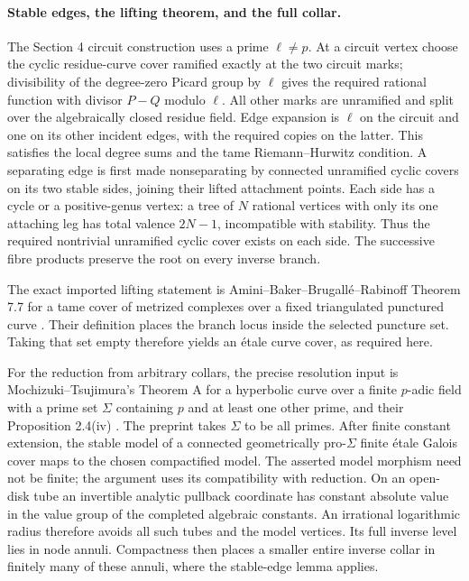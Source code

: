 \paragraph{Stable edges, the lifting theorem, and the full collar.}
The Section 4 circuit construction uses a prime $\ell\ne p$.
At a circuit vertex choose the cyclic residue-curve cover
ramified exactly at the two circuit marks; divisibility of
the degree-zero Picard group by $\ell$ gives the required
rational function with divisor $P-Q$ modulo $\ell$. All
other marks are unramified and split over the algebraically
closed residue field. Edge expansion is $\ell$ on the
circuit and one on its other incident edges, with the
required copies on the latter. This satisfies the local
degree sums and the tame Riemann--Hurwitz condition. A
separating edge is first made nonseparating by connected
unramified cyclic covers on its two stable sides, joining
their lifted attachment points. Each side has a cycle or
a positive-genus vertex: a tree of $N$ rational vertices
with only its one attaching leg has total valence $2N-1$,
incompatible with stability. Thus the required nontrivial
unramified cyclic cover exists on each side. The successive
fibre products preserve the root on every inverse branch.

The exact imported lifting statement is Amini--Baker--Brugall\'e--Rabinoff
Theorem 7.7 for a tame cover of metrized complexes over a fixed
triangulated punctured curve
\cite[Definition 4.31 and Theorem 7.7]{AgentABBR}.
Their definition places the branch locus inside the selected
puncture set. Taking that set empty therefore yields an
\'etale curve cover, as required here.

For the reduction from arbitrary collars, the precise
resolution input is Mochizuki--Tsujimura's Theorem A for a
hyperbolic curve over a finite $p$-adic field with a prime
set $\Sigma$ containing $p$ and at least one other prime,
and their Proposition 2.4(iv)
\cite[Theorem A and Proposition 2.4(iv)]{AgentMochizukiTsujimura}.
The preprint takes $\Sigma$ to be all primes. After finite
constant extension, the stable model of a connected
geometrically pro-$\Sigma$ finite \'etale Galois cover maps
to the chosen compactified model. The asserted model
morphism need not be finite; the argument uses its
compatibility with reduction. On an open-disk tube an
invertible analytic pullback coordinate has constant
absolute value in the value group of the completed
algebraic constants. An irrational logarithmic radius
therefore avoids all such tubes and the model vertices.
Its full inverse level lies in node annuli. Compactness
then places a smaller entire inverse collar in finitely
many of these annuli, where the stable-edge lemma applies.

